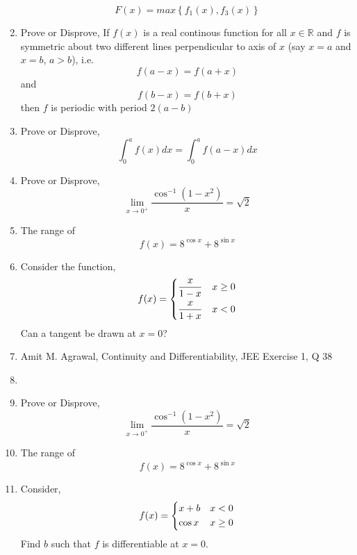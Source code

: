 \documentclass{article}
\begin{document}
\begin{enumerate}
          $$F(x)=max\left\{f_{1}(x),f_{3}(x)\right\}$$
    \item Prove or Disprove,
          If $f(x)$ is a real continous function for all $x \in \mathbb{R}$ and $f$ is symmetric about two different lines perpendicular to axis of $x$ (say $x=a$ and $x=b$, $a>b$), i.e. $$f(a-x)=f(a+x) $$ and $$f(b-x)=f(b+x)$$ then $f$ is periodic with period $2(a-b)$
    \item Prove or Disprove,
          $$\displaystyle\int_{0}^{a} f(x) dx=\displaystyle\int_{0}^{a} f(a-x) dx$$
    \item Prove or Disprove,
          $$\lim\limits_{x \to 0^+}{\dfrac{\cos^{-1} \left(1-x^2\right)}{x}}=\sqrt{2}$$
    \item The range of $$f(x)=8^{\cos x}+8^{\sin x}$$
    \item Consider the function, $$f(x)=\begin{dcases}
                  \dfrac{x}{1-x} & x \ge 0 \\
                  \dfrac{x}{1+x} & x < 0
              \end{dcases}$$
          Can a tangent be drawn at $x=0$?
    \item Amit M. Agrawal, Continuity and Differentiability, JEE Exercise 1, Q 38
    \item       \item Prove or Disprove,
          $$\lim\limits_{x \to 0^+}{\dfrac{\cos^{-1} \left(1-x^2\right)}{x}}=\sqrt{2}$$
    \item The range of $$f(x)=8^{\cos x}+8^{\sin x}$$
    \item Consider, $$f(x)=\begin{dcases}
        x+b & x<0 \\
        \cos x & x \ge 0
  \end{dcases}$$
  Find $b$ such that $f$ is differentiable at $x=0$.
\end{enumerate}
\end{document}
